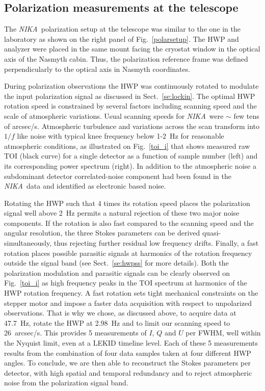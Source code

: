 \documentclass[twocolumn, traditabstract]{aa}
\newcommand{\nika}{{\it NIKA}}
\begin{document}
\subsection{Polarization measurements at the telescope}
\label{polsetup}
The \nika\ polarization setup at the telescope was similar to the one in the
laboratory as shown on the right panel of Fig.~\ref{polarsetup}.  The HWP and
analyzer were placed in the same mount facing the cryostat window in the optical
axis of the Nasmyth cabin. Thus, the polarization reference frame was defined
perpendicularly to the optical axis in Nasmyth coordinates. 

During polarization observations the HWP was continuously rotated to modulate
the input polarization signal as discussed in Sect.~\ref{se:lockin}. The optimal
HWP rotation speed is constrained by several factors including scanning speed
and the scale of atmospheric variations. Usual scanning speeds for \nika\ were
$\sim$ few tens of arcsec/s. Atmospheric turbulence and variations
across the scan transform into $1/f$ like noise with typical knee frequency
below 1-2~Hz for reasonable atmospheric conditions, as illustrated on
Fig.~\ref{toi_i} that shows measured raw TOI (black curve) for a single detector as a
function of sample number (left) and its corresponding power spectrum
(right). In addition to the atmospheric noise a subdominant detector
correlated-noise component had been found in the \nika\ data and identified as
electronic based noise. 

Rotating the HWP such that 4 times its rotation speed places the polarization
signal well above 2~Hz  permits a natural rejection of these two major
noise components. If the rotation is also fast compared to the scanning speed
and the angular resolution, the three Stokes parameters can be derived
quasi-simultaneously, thus rejecting further residual low frequency
drifts. Finally, a fast rotation places possible parasitic signals at harmonics
of the rotation frequency outside the signal band (see Sect.~\ref{se:hwpss} for
more details). Both the polarization modulation and parasitic signals can be
clearly observed on Fig.~\ref{toi_i} as high frequency peaks in the TOI
spectrum at harmonics of the HWP rotation frequency. A fast rotation sets tight mechanical constraints on the stepper motor 
and impose a faster data acquisition with respect to unpolarized observations. That
is why we chose, as discussed above, to acquire data at 47.7~Hz, rotate
the HWP at 2.98~Hz and to limit our scanning speed to 26~arcsec/s. This
provides 5 measurements of $I$, $Q$ and $U$ per FWHM, well within the Nyquist limit,
even at a LEKID timeline level. Each of these 5 measurements results from the
  combination of four data samples taken at four different HWP angles. To
  conclude, we are then able to reconstruct the Stokes parameters per
  detector, with high spatial and temporal redundancy and to reject atmospheric
  noise from the polarization signal band.
\end{document}
